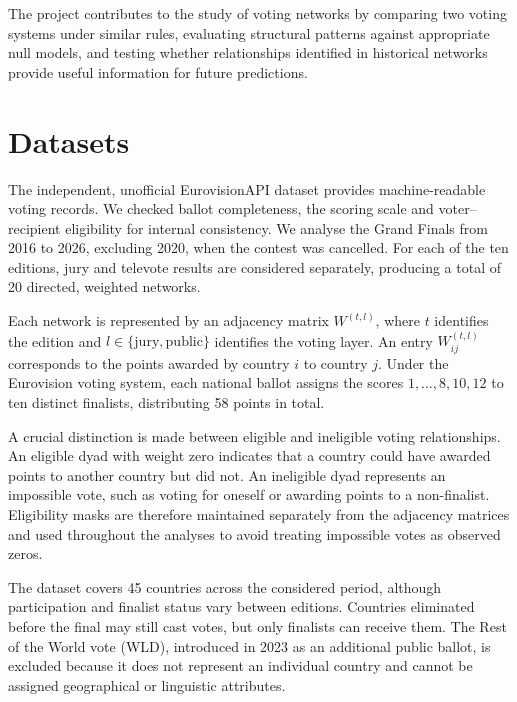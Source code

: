 \documentclass[12pt,a4paper]{article}
\begin{document}
The project contributes to the study of voting networks
by comparing two voting systems under similar rules,
evaluating structural patterns against appropriate
null models, and testing whether relationships
identified in historical networks provide useful
information for future predictions.




\section{Datasets}
\label{datasets}


The independent, unofficial EurovisionAPI dataset \cite{eurovisionapi}
provides machine-readable voting records. We checked ballot
completeness, the scoring scale and voter--recipient eligibility
for internal consistency.
We analyse the Grand Finals from 2016 to 2026,
excluding 2020, when the contest was cancelled.
For each of the ten editions, jury and televote results
are considered separately, producing a total of
20 directed, weighted networks.

Each network is represented by an adjacency matrix
$W^{(t,l)}$, where $t$ identifies the edition and
$l \in \{\mathrm{jury}, \mathrm{public}\}$ identifies
the voting layer. An entry $W_{ij}^{(t,l)}$ corresponds
to the points awarded by country $i$ to country $j$.
Under the Eurovision voting system, each national
ballot assigns the scores $1,\ldots,8,10,12$ to
ten distinct finalists, distributing 58 points
in total.

A crucial distinction is made between eligible
and ineligible voting relationships. An eligible
dyad with weight zero indicates that a country
could have awarded points to another country
but did not. An ineligible dyad represents an
impossible vote, such as voting for oneself or
awarding points to a non-finalist. Eligibility
masks are therefore maintained separately from
the adjacency matrices and used throughout the
analyses to avoid treating impossible votes as
observed zeros.

The dataset covers 45 countries across the
considered period, although participation and
finalist status vary between editions. Countries
eliminated before the final may still cast votes,
but only finalists can receive them. The
Rest of the World vote (WLD), introduced in
2023 as an additional public ballot, is excluded
because it does not represent an individual country
and cannot be assigned geographical or linguistic
attributes.
\end{document}
